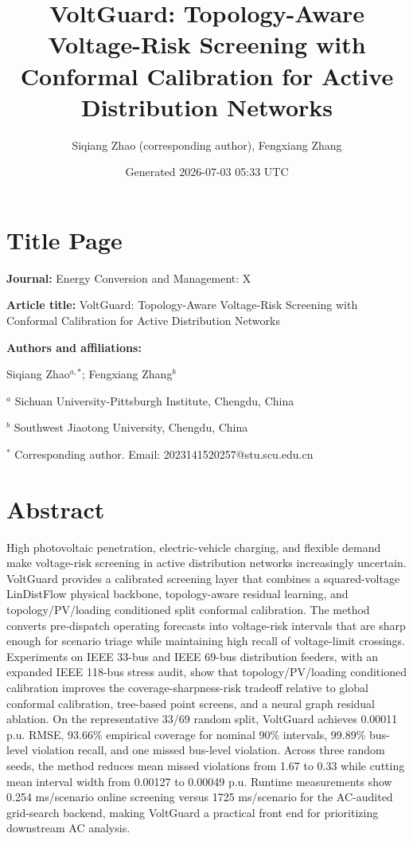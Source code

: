 \documentclass[
  preprint,12pt]{elsarticle}
\title{VoltGuard: Topology-Aware Voltage-Risk Screening with Conformal
Calibration for Active Distribution Networks}
\author{Siqiang Zhao (corresponding author), Fengxiang Zhang}
\date{Generated 2026-07-03 05:33 UTC}
\begin{document}
\maketitle

\section*{Title Page}\label{title-page}

\textbf{Journal:} Energy Conversion and Management: X

\textbf{Article title:} VoltGuard: Topology-Aware Voltage-Risk Screening
with Conformal Calibration for Active Distribution Networks

\textbf{Authors and affiliations:}

Siqiang Zhao\(^{a,*}\); Fengxiang Zhang\(^{b}\)

\(^{a}\) Sichuan University-Pittsburgh Institute, Chengdu, China

\(^{b}\) Southwest Jiaotong University, Chengdu, China

\(^{*}\) Corresponding author. Email: 2023141520257@stu.scu.edu.cn

\section*{Abstract}\label{abstract}

High photovoltaic penetration, electric-vehicle charging, and flexible
demand make voltage-risk screening in active distribution networks
increasingly uncertain. VoltGuard provides a calibrated screening layer
that combines a squared-voltage LinDistFlow physical backbone,
topology-aware residual learning, and topology/PV/loading conditioned
split conformal calibration. The method converts pre-dispatch operating
forecasts into voltage-risk intervals that are sharp enough for scenario
triage while maintaining high recall of voltage-limit crossings.
Experiments on IEEE 33-bus and IEEE 69-bus distribution feeders, with an
expanded IEEE 118-bus stress audit, show that topology/PV/loading
conditioned calibration improves the coverage-sharpness-risk tradeoff
relative to global conformal calibration, tree-based point screens, and
a neural graph residual ablation. On the representative 33/69 random
split, VoltGuard achieves 0.00011 p.u. RMSE, 93.66\% empirical coverage
for nominal 90\% intervals, 99.89\% bus-level violation recall, and one
missed bus-level violation. Across three random seeds, the method
reduces mean missed violations from 1.67 to 0.33 while cutting mean
interval width from 0.00127 to 0.00049 p.u. Runtime measurements show
0.254 ms/scenario online screening versus 1725 ms/scenario for the
AC-audited grid-search backend, making VoltGuard a practical front end
for prioritizing downstream AC analysis.
\end{document}
